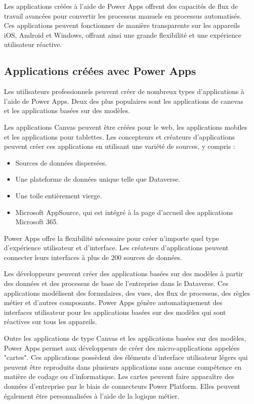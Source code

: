 \documentclass[a4paper, oneside, 12pt, final]{extreport}
\begin{document}
Les applications créées à l'aide de Power Apps offrent des capacités de flux de travail avancées pour convertir les processus manuels en processus automatisés. Ces applications peuvent fonctionner de manière transparente sur les appareils iOS, Android et Windows, offrant ainsi une grande flexibilité et une expérience utilisateur réactive.


\subsection{Applications créées avec Power Apps}
Les utilisateurs professionnels peuvent créer de nombreux types d'applications à l'aide de Power Apps. Deux des plus populaires sont les applications de canevas et les applications basées sur des modèles.

Les applications Canvas peuvent être créées pour le web, les applications mobiles et les applications pour tablettes. Les concepteurs et créateurs d'applications peuvent créer ces applications en utilisant une variété de sources, y compris :
\begin{itemize}
\item Sources de données dispersées.
\item Une plateforme de données unique telle que Dataverse.
\item Une toile entièrement vierge.
\item Microsoft AppSource, qui est intégré à la page d'accueil des applications Microsoft 365.
\end{itemize}

Power Apps offre la flexibilité nécessaire pour créer n'importe quel type d'expérience utilisateur et d'interface. Les créateurs d'applications peuvent connecter leurs interfaces à plus de 200 sources de données.

Les développeurs peuvent créer des applications basées sur des modèles à partir des données et des processus de base de l'entreprise dans le Dataverse. Ces applications modélisent des formulaires, des vues, des flux de processus, des règles métier et d'autres composants. Power Apps génère automatiquement des interfaces utilisateur pour les applications basées sur des modèles qui sont réactives sur tous les appareils.

Outre les applications de type Canvas et les applications basées sur des modèles, Power Apps permet aux développeurs de créer des micro-applications appelées "cartes". Ces applications possèdent des éléments d'interface utilisateur légers qui peuvent être reproduits dans plusieurs applications sans aucune compétence en matière de codage ou d'informatique. Les cartes peuvent faire apparaître des données d'entreprise par le biais de connecteurs Power Platform. Elles peuvent également être personnalisées à l'aide de la logique métier.
\end{document}
